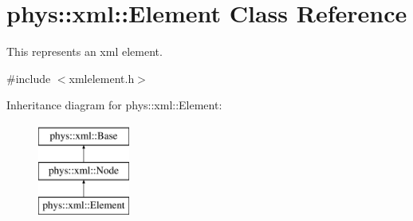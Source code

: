 \hypertarget{classphys_1_1xml_1_1Element}{
\section{phys::xml::Element Class Reference}
\label{db/dbd/classphys_1_1xml_1_1Element}
}


This represents an xml element.  




{\ttfamily \#include $<$xmlelement.h$>$}

Inheritance diagram for phys::xml::Element:\begin{figure}[H]
\begin{center}
\leavevmode
\includegraphics[height=3.000000cm]{db/dbd/classphys_1_1xml_1_1Element}
\end{center}
\end{figure}
